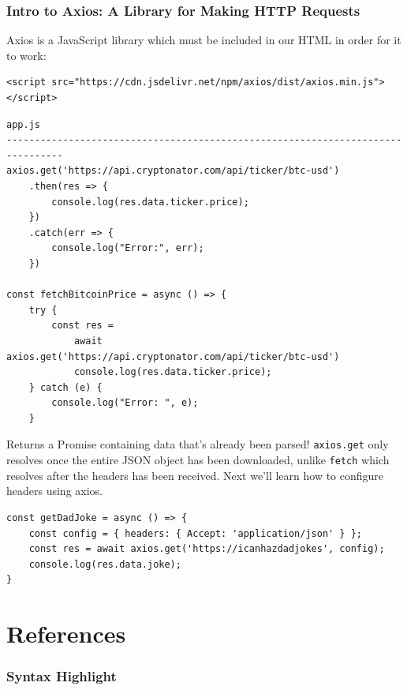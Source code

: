 \documentclass[11pt, letterpaper]{article}
\begin{document}
\subsubsection*{Intro to Axios: A Library for Making HTTP Requests}

Axios is a JavaScript library which must be included in our HTML in order for it to work:

{\small
\begin{verbatim}
<script src="https://cdn.jsdelivr.net/npm/axios/dist/axios.min.js">
</script>
\end{verbatim}
}

{\small
\begin{verbatim}
app.js
--------------------------------------------------------------------------------
axios.get('https://api.cryptonator.com/api/ticker/btc-usd')
    .then(res => {
        console.log(res.data.ticker.price);
    })
    .catch(err => {
        console.log("Error:", err);
    })

const fetchBitcoinPrice = async () => {
    try {
        const res = 
            await axios.get('https://api.cryptonator.com/api/ticker/btc-usd')
            console.log(res.data.ticker.price);
    } catch (e) {
        console.log("Error: ", e);
    }
\end{verbatim}
}

Returns a Promise containing data that's already been parsed! \verb+axios.get+ only resolves once the entire JSON
object has been downloaded, unlike \verb+fetch+ which resolves after the headers has been received. Next we'll learn
how to configure headers using axios. \\

\begin{verbatim}
const getDadJoke = async () => {
    const config = { headers: { Accept: 'application/json' } };
    const res = await axios.get('https://icanhazdadjokes', config);
    console.log(res.data.joke);
}
\end{verbatim}

\section{References}

\subsubsection*{Syntax Highlight}
\end{document}
